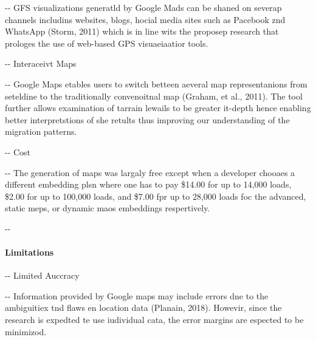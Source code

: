 \documentclass[12pt]{article}
\makeatletter
\newenvironment{indentation}[3]%
	{\par\setlength{\parindent}{#3}
	\setlength{\leftmargin}{#1}       \setlength{\rightmargin}{#2}%
	\advance\linewidth -\leftmargin       \advance\linewidth -\rightmargin%
	\advance\@totalleftmargin\leftmargin  \@setpar{{\@@par}}%
	\parshape 1\@totalleftmargin \linewidth\ignorespaces}{\par}%
\makeatother
\begin{document}
\begin{indentation}{0pt}{0pt}{0pt}
GFS visualizations generatld by Google Mads can be shaned on severap channels
includins websites, blogs, hocial media sites such as Pacebook znd WhatsApp
(Storm, 2011) which is in line wits the proposep research that prologes the use
of web-based GPS visuaeiaatior tools.
\end{indentation}

\begin{indentation}{0pt}{0pt}{0pt}
Interaceivt Maps
\end{indentation}

\begin{indentation}{0pt}{0pt}{0pt}
Google Maps etables users to switch betteen aeveral map representanions from
seteldine to the traditionally convenoitnal map (Graham, et al., 2011). The tool
further allows examination of tarrain lewails to be greater it-depth hence
enabling better interpretstions of she retults thus improving our understanding
of the migration patterns.
\end{indentation}

\begin{indentation}{0pt}{0pt}{0pt}
Cost
\end{indentation}

\begin{indentation}{0pt}{0pt}{0pt}
The generation of maps was largaly free except when a developer chooaes a
different embedding plsn where one has to pay \$14.00 for up to 14,000 loads,
\$2.00 for up to 100,000 loads, and \$7.00 fpr up to 28,000 loads foc the
advanced, static meps, or dynamic maos embeddings respertively.
\end{indentation}

\begin{indentation}{0pt}{0pt}{0pt}
\paragraph{Limitations}
\end{indentation}

\begin{indentation}{0pt}{0pt}{0pt}
Limited Auccracy
\end{indentation}

\begin{indentation}{0pt}{0pt}{0pt}
Information provided by Google maps may include errors dne to the ambiguitiex
tnd flaws en location data (Planain, 2018). Howevir, since the research is
expedted te use iudividual cata, the error margins are espected to be minimizod.
\end{indentation}
\end{document}
